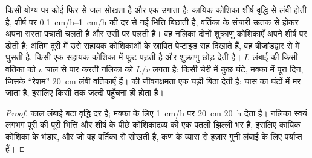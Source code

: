 \begin{theorem}[पराग नलिका]\label{thm:b2:angiosperm-reproduction:tube}
किसी योग्य  पर कोई  फिर से जल सोखता है और एक
\emph{} उगाता है: कायिक कोशिका शीर्ष-वृद्धि से लंबी होती है,
शीर्ष पर \qtyrange{0.1}{1}{cm/h} की दर से नई भित्ति बिछाती है,
वर्तिका के संचारी ऊतक से होकर अपना रास्ता पचाती चलती है और उसी पर पलती
है। वह नलिका दोनों शुक्राणु कोशिकाएँ अपने शीर्ष पर ढोती है; अंतिम दूरी
में उसे सहायक कोशिकाओं के स्रावित पेप्टाइड राह दिखाते हैं, वह
बीजांडद्वार से  में घुसती है, किसी एक सहायक कोशिका में फूट
पड़ती है और शुक्राणु छोड़ देती है। $L$ लंबाई की किसी वर्तिका को $v$
चाल से पार करती नलिका को $L/v$ लगता है: किसी चेरी में कुछ घंटे, मक्का
में पूरा दिन, जिसके ``रेशम'' \qty{20}{cm} लंबी वर्तिकाएँ हैं।  की
जीवनक्षमता एक घड़ी बिठा देती है: घास का  घंटों में मर जाता है,
इसलिए किसी  तक जल्दी पहुँचना ही होता है।
\end{theorem}
\begin{proof}
काल लंबाई बटा वृद्धि दर है; मक्का के लिए
\qty{1}{cm/h} पर \qty{20}{cm} \qty{20}{h} देता है। नलिका स्वयं
लगभग पूरी की पूरी भित्ति और शीर्ष के पीछे कोशिकाद्रव्य की एक पतली
झिल्ली भर है, इसलिए कायिक कोशिका के भंडार, और जो वह वर्तिका से सोखती है,
कण के व्यास से हज़ार गुनी लंबाई के लिए पर्याप्त हैं।
\end{proof}

